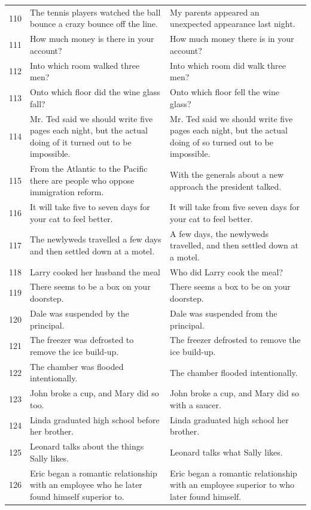 \documentclass[doc]{apa6}
\begin{document}
\begin{small}
\begin{longtable}{p{1cm} | p{8.5cm} | p{8.5cm}}
110 & The tennis players watched the ball bounce a crazy bounce off the line. & My parents appeared an unexpected appearance last night.\\
111 & How much money is there in your account? & How much money there is in your account?\\
112 & Into which room walked three men? & Into which room did walk three men?\\
113 & Onto which floor did the wine glass fall? & Onto which floor fell the wine glass?\\
114 & Mr. Ted said we should write five pages each night, but the actual doing of it turned out to be impossible. & Mr. Ted said we should write five pages each night, but the actual doing of so turned out to be impossible.\\
115 & From the Atlantic to the Pacific there are people who oppose immigration reform. & With the generals about a new approach the president talked.\\
116 & It will take five to seven days for your cat to feel better. & It will take from five seven days for your cat to feel better.\\
117 & The newlyweds travelled a few days and then settled down at a motel. & A few days, the newlyweds travelled, and then settled down at a motel.\\
118 & Larry cooked her husband the meal & Who did Larry cook the meal?\\
119 & There seems to be a box on your doorstep. & There seems a box to be on your doorstep.\\
120 & Dale was suspended by the principal. & Dale was suspended from the principal.\\
121 & The freezer was defrosted to remove the ice build-up. & The freezer defrosted to remove the ice build-up.\\
122 & The chamber was flooded intentionally. & The chamber flooded intentionally.\\
123 & John broke a cup, and Mary did so too. & John broke a cup, and Mary did so with a saucer.\\
124 & Linda graduated high school before her brother. & Linda graduated high school her brother.\\
125 & Leonard talks about the things Sally likes. & Leonard talks what Sally likes.\\
126 & Eric began a romantic relationship with an employee who he later found himself superior to. & Eric began a romantic relationship with an employee superior to who later found himself.\\

\end{longtable}
\end{small}
\end{document}
